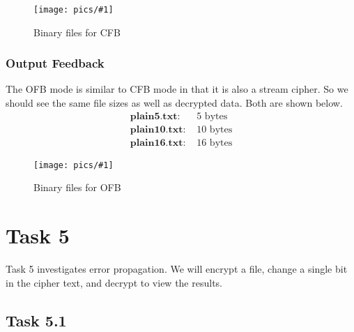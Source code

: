\documentclass[11pt]{article}
\newcommand{\fig}[2]{ 
\begin{figure}[h]
	\centering
	\caption{#2}
	\texttt{[image: pics/\#1]}
	\label{fig:#1}
\end{figure} 
}
\begin{document}
\fig{task4.2.2}{Binary files for CFB}


\subsubsection*{Output Feedback}

The OFB mode is similar to CFB mode in that it is also a stream cipher. So we should see the same file sizes as well as decrypted data. Both are shown below.
\begin{align*}
\textbf{plain5.txt: }  & 5 \text{ bytes} \\
\textbf{plain10.txt: } & 10 \text{ bytes} \\
\textbf{plain16.txt: } & 16 \text{ bytes}
\end{align*}

\fig{task4.2.3}{Binary files for OFB}


\newpage
\section*{Task 5}

Task 5 investigates error propagation. We will encrypt a file, change a single bit in the cipher text, and decrypt to view the results.

\subsection*{Task 5.1}
\end{document}
